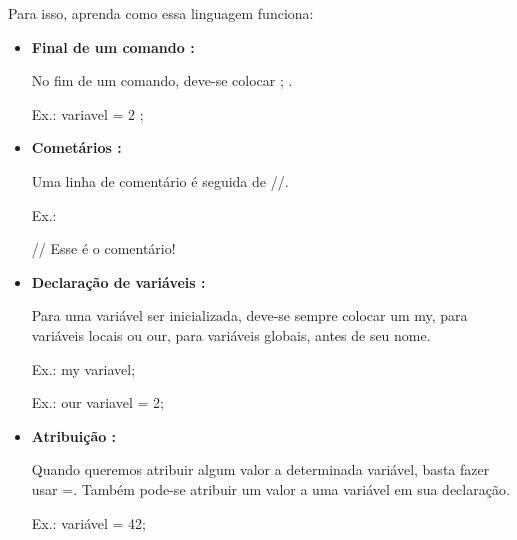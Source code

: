 \documentclass[a4paper]{article}
\begin{document}
{{{{    Para isso, aprenda como essa linguagem funciona:
    
    \begin{itemize}
        
        \item \textbf{Final de um comando :}
        
            No fim de um comando, deve-se colocar 
            \textcolor{NavyBlue}{;}
            .
        
            \textcolor{NavyBlue}{Ex.:} variavel = 2
            \textcolor{NavyBlue}{;}
        
        \bigskip
        
        \item \textbf{Cometários :}
            
            Uma linha de comentário é seguida de 
            \textcolor{NavyBlue}{//}.
            
            \textcolor{NavyBlue}{Ex.:}
            
            // Esse é o comentário!
       
       \bigskip
       
        \item \textbf{Declaração de variáveis :}
        
            Para uma variável ser inicializada, deve-se
            sempre colocar um 
            \textcolor{NavyBlue}{my},
            para variáveis locais ou 
            \textcolor{NavyBlue}{our},
            para variáveis globais,
            antes de seu nome.
            
            \textcolor{NavyBlue}{Ex.:}
            \textcolor{NavyBlue}{my} 
            variavel;
        
            \textcolor{NavyBlue}{Ex.:} 
            \textcolor{NavyBlue}{our} variavel = 2;  
        
        \bigskip
        
        \item \textbf{Atribuição :}
        
            Quando queremos atribuir algum valor a
            determinada variável, basta fazer usar 
            \textcolor{NavyBlue}{=}.
            Também pode-se atribuir um valor a uma
            variável em sua declaração.
            
            \textcolor{NavyBlue}{Ex.:}
            variável 
            \textcolor{NavyBlue}{=}
            42;
            
        \bigskip
        

\end{itemize}}}}}
\end{document}
